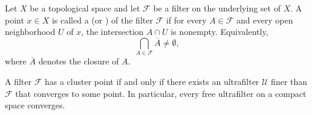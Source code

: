 \begin{definition} \label{definition:cluster_point_of_a_filter}

    Let $X$ be a topological space and let $\mathcal{F}$ be a filter on the underlying set of $X$. A point $x \in X$ is called a  (or ) of the filter $\mathcal{F}$ if for every $A \in \mathcal{F}$ and every open neighborhood $U$ of $x$, the intersection $A \cap U$ is nonempty. Equivalently,
    $$\bigcap_{A \in \mathcal{F}} \overline{A} \neq \emptyset,$$
    where $\overline{A}$ denotes the closure of $A$.

    A filter $\mathcal{F}$ has a cluster point if and only if there exists an ultrafilter $\mathcal{U}$ finer than $\mathcal{F}$ that converges to some point. In particular, every free ultrafilter on a compact space converges.
\end{definition}
